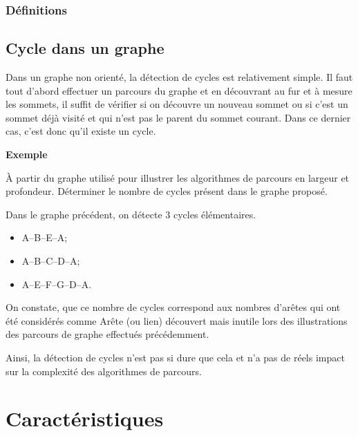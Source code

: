 \begin{frame}
\frametitle{Définitions}

\subsection{Cycle dans un graphe}
Dans un graphe non orienté, la détection de cycles est relativement simple. Il faut tout d'abord effectuer un parcours du graphe et en découvrant au fur et à mesure les sommets, il suffit de vérifier si on découvre un nouveau sommet ou si c'est un sommet déjà visité et qui n'est pas le parent du sommet courant. Dans ce dernier cas, c'est donc qu'il existe un cycle.

\textbf{Exemple}

\`A partir du graphe utilisé pour illustrer les algorithmes de parcours en largeur et profondeur. Déterminer le nombre de cycles présent dans le graphe proposé.

Dans le graphe précédent, on détecte 3 cycles élémentaires. \begin{itemize}
\item A--B--E--A;
\item A--B--C--D--A;
\item A--E--F--G--D--A.
\end{itemize}


On constate, que ce nombre de cycles correspond aux nombres d'arêtes qui ont été considérés comme \og Arête (ou lien) découvert mais inutile  \fg{} lors des illustrations des parcours de graphe effectués précédemment.

Ainsi, la détection de cycles n'est pas si \og dure \fg{} que cela et n'a pas de réels impact sur la complexité des algorithmes de parcours. 
\end{frame}

\section{Caractéristiques}


